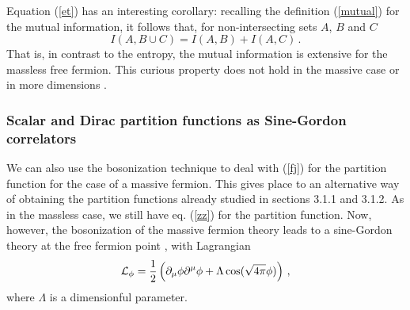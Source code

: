 \documentclass[11pt]{article}
\begin{document}
Equation (\ref{et}) has an interesting corollary: recalling the
definition (\ref{mutual}) for the mutual information, it follows that, for
non-intersecting sets $A$, $B$ and $C$
\begin{equation}
I(A,B\cup C)=I(A,B)+I(A,C)\,.
\end{equation}
That is, in contrast to the entropy, the mutual information is extensive for the massless free fermion. This curious property
does not hold in the massive case or in more dimensions \cite{remarks}. 

\subsubsection{Scalar and Dirac partition functions as Sine-Gordon correlators}
We can also use the bosonization technique to deal with (\ref{fj}) for the
partition function for the case of a massive fermion.
This gives place to an alternative way of obtaining the partition functions already studied in sections 3.1.1 and 3.1.2.
As in the massless case, we still  
have eq. (\ref{zz}) for the partition function. Now, however, the bosonization of the massive fermion theory
leads to a sine-Gordon theory at the free fermion point \cite{sinegordon}, with Lagrangian 
\begin{equation}
{\cal L}_\phi=\frac{1}{2}\left( \partial_\mu \phi \partial ^\mu \phi+\Lambda \cos(\sqrt{4 \pi}\phi)\right)\,,\label{sg}
\end{equation}
where $\Lambda$ is a dimensionful parameter. 
 
\end{document}

